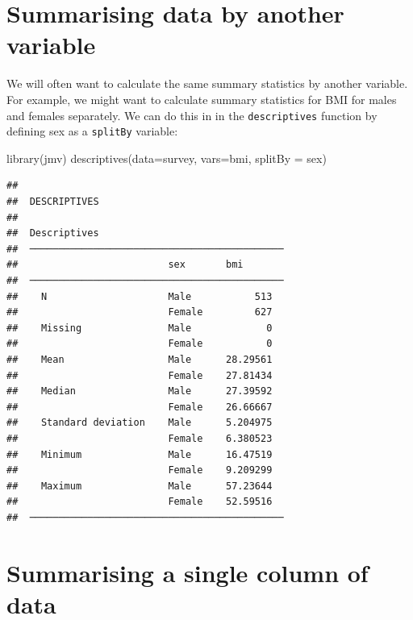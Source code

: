\documentclass[
]{memoir}
\newenvironment{Shaded}{\begin{snugshade}}{\end{snugshade}}
\newcommand{\AttributeTok}[1]{\textcolor[rgb]{0.77,0.63,0.00}{#1}}
\newcommand{\FunctionTok}[1]{\textcolor[rgb]{0.00,0.00,0.00}{#1}}
\newcommand{\NormalTok}[1]{#1}
\begin{document}
\hypertarget{summarising-data-by-another-variable}{%
\section{Summarising data by another variable}\label{summarising-data-by-another-variable}}

We will often want to calculate the same summary statistics by another variable. For example, we might want to calculate summary statistics for BMI for males and females separately. We can do this in in the \texttt{descriptives} function by defining sex as a \texttt{splitBy} variable:

\begin{Shaded}
\begin{Highlighting}[]
\FunctionTok{library}\NormalTok{(jmv)}
\FunctionTok{descriptives}\NormalTok{(}\AttributeTok{data=}\NormalTok{survey, }\AttributeTok{vars=}\NormalTok{bmi, }\AttributeTok{splitBy =}\NormalTok{ sex)}
\end{Highlighting}
\end{Shaded}

\begin{verbatim}
## 
##  DESCRIPTIVES
## 
##  Descriptives                                 
##  ──────────────────────────────────────────── 
##                          sex       bmi        
##  ──────────────────────────────────────────── 
##    N                     Male           513   
##                          Female         627   
##    Missing               Male             0   
##                          Female           0   
##    Mean                  Male      28.29561   
##                          Female    27.81434   
##    Median                Male      27.39592   
##                          Female    26.66667   
##    Standard deviation    Male      5.204975   
##                          Female    6.380523   
##    Minimum               Male      16.47519   
##                          Female    9.209299   
##    Maximum               Male      57.23644   
##                          Female    52.59516   
##  ────────────────────────────────────────────
\end{verbatim}

\hypertarget{summarising-a-single-column-of-data}{%
\section{Summarising a single column of data}\label{summarising-a-single-column-of-data}}
\end{document}
